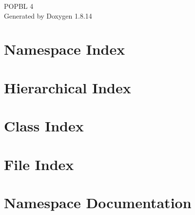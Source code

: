 \documentclass[twoside]{book}
\newcommand{\+}{\discretionary{\mbox{\scriptsize$\hookleftarrow$}}{}{}}
\newcommand{\clearemptydoublepage}{%
  \newpage{\pagestyle{empty}\cleardoublepage}%
}
\begin{document}
\hypersetup{pageanchor=false,
             bookmarksnumbered=true,
             pdfencoding=unicode
            }
\begin{titlepage}
\vspace*{7cm}
\begin{center}%
{\Large P\+O\+P\+BL 4 }\\
\vspace*{1cm}
{\large Generated by Doxygen 1.8.14}\\
\end{center}
\end{titlepage}
\clearemptydoublepage
{}
\tableofcontents
\clearemptydoublepage
{}
\hypersetup{pageanchor=true}

\chapter{Namespace Index}

\chapter{Hierarchical Index}

\chapter{Class Index}

\chapter{File Index}

\chapter{Namespace Documentation}









\end{document}
